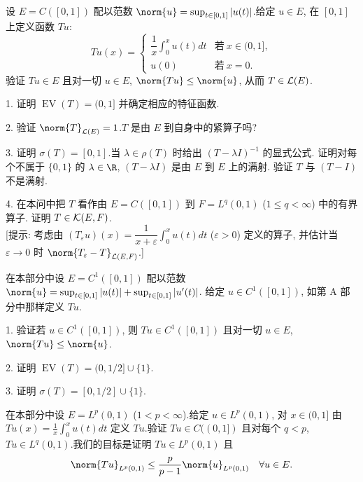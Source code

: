 \begin{problem}[第 4, 6 章]
\label{prob:34}


设 $E=C([0,1])$ 配以范数 $\norm{u}=\sup_{t\in[0,1]}\abs{u(t)}$.给定 $u\in E$, 在 $[0,1]$
上定义函数 $Tu$:
\begin{equation*}
Tu(x)=\begin{cases}
\dfrac1x\int_0^xu(t)dt & \text{若}\ x\in(0,1],\\
u(0) & \text{若}\ x=0.
\end{cases}
\end{equation*}
验证 $Tu\in E$ 且对一切 $u\in E$, $\norm{Tu}\le\norm{u}$, 从而 $T\in\mathcal{L}(E)$.

1. 证明 $\operatorname{EV}(T)=(0,1]$ 并确定相应的特征函数.

2. 验证 $\norm{T}_{\LL(E)}=1$.$T$ 是由 $E$ 到自身中的紧算子吗?

3. 证明 $\sigma(T)=[0,1]$.当 $\lambda\in\rho(T)$ 时给出 $(T-\lambda I)^{-1}$ 的显式公式.
证明对每个不属于 $\{0,1\}$ 的 $\lambda\in\R$, $(T-\lambda I)$ 是由 $E$ 到 $E$ 上的满射.
验证 $T$ 与 $(T-I)$ 不是满射.

4. 在本问中把 $T$ 看作由 $E=C([0,1])$ 到 $F=L^q(0,1)$ ($1\le q<\infty$) 中的有界算子.
证明 $T\in\mathcal{K}(E,F)$.\\
{[提示: 考虑由 $(T_\varepsilon u)(x)=\dfrac{1}{x+\varepsilon}\int_0^xu(t)dt$ ($\varepsilon>0$)
定义的算子, 并估计当 $\varepsilon\to0$ 时 $\norm{T_\varepsilon-T}_{\LL(E,F)}$.]}


在本部分中设 $E=C^1([0,1])$ 配以范数 $\norm{u}=\sup_{t\in[0,1]}\abs{u(t)}+\sup_{t\in[0,1]}\abs{u'(t)}$.
给定 $u\in C^1([0,1])$, 如第 A 部分中那样定义 $Tu$.

1. 验证若 $u\in C^1([0,1])$, 则 $Tu\in C^1([0,1])$ 且对一切 $u\in E$, $\norm{Tu}\le\norm{u}$.

2. 证明 $\operatorname{EV}(T)=(0,1/2]\cup\{1\}$.

3. 证明 $\sigma(T)=[0,1/2]\cup\{1\}$.


在本部分中设 $E=L^p(0,1)$ ($1<p<\infty$).给定 $u\in L^p(0,1)$, 对 $x\in(0,1]$ 由
$Tu(x)=\frac1x\int_0^xu(t)dt$ 定义 $Tu$.验证 $Tu\in C((0,1])$ 且对每个 $q<p$,
$Tu\in L^q(0,1)$.我们的目标是证明 $Tu\in L^p(0,1)$ 且
\begin{equation}
\norm{Tu}_{L^p(0,1)}\le\frac{p}{p-1}\norm{u}_{L^p(0,1)}\quad\forall u\in E.
\label{eq:prob34.1}
\end{equation}


\end{problem}

